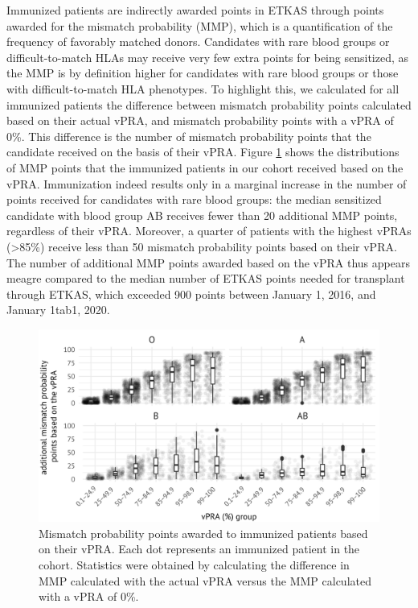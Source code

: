 \documentclass[11pt,twoside,]{book}
\begin{document}
Immunized patients are indirectly awarded points in ETKAS through points awarded
for the mismatch probability (MMP), which is a quantification of the frequency of favorably
matched donors. Candidates with rare
blood groups or difficult-to-match HLAs may receive very few extra points for being
sensitized, as the MMP is by definition higher for candidates with rare blood groups or those with difficult-to-match HLA phenotypes. To highlight this, we calculated for
all immunized patients the difference between mismatch probability
points calculated based on their actual vPRA, and mismatch probability
points with a vPRA of 0\%. This difference is the number of mismatch probability
points that the candidate received on the basis of their vPRA.
\newpage
Figure \ref{fig:ch7fig4} shows the distributions of MMP points that the immunized patients in our cohort received based on
the vPRA. Immunization indeed results only in a marginal increase in the number
of points received for candidates with rare blood groups: the median
sensitized candidate with blood group AB receives fewer than 20 additional
MMP points, regardless of their vPRA. Moreover, a quarter of patients with
the highest vPRAs (\textgreater85\%) receive less than 50 mismatch probability points
based on their vPRA. The number of additional MMP points awarded based
on the vPRA thus appears meagre compared to the median number of ETKAS points needed for
transplant through ETKAS, which exceeded 900 points between
January 1, 2016, and January 1tab1, 2020.

\begin{figure}[ht]

{\centering \includegraphics[width=0.95\linewidth]{figures/ch7//figure4} 

}

\caption{Mismatch probability points awarded to immunized patients based on their vPRA. Each dot represents an immunized patient in the cohort. Statistics were obtained by calculating the difference in MMP calculated with the actual vPRA versus the MMP calculated with a vPRA of 0\%.}\label{fig:ch7fig4}
\end{figure}
\end{document}
